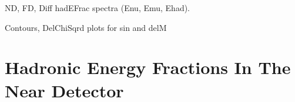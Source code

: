 
ND, FD, Diff hadEFrac spectra (Enu, Emu, Ehad).

Contours, DelChiSqrd plots for sin and delM


\section{Hadronic Energy Fractions In The Near Detector}


